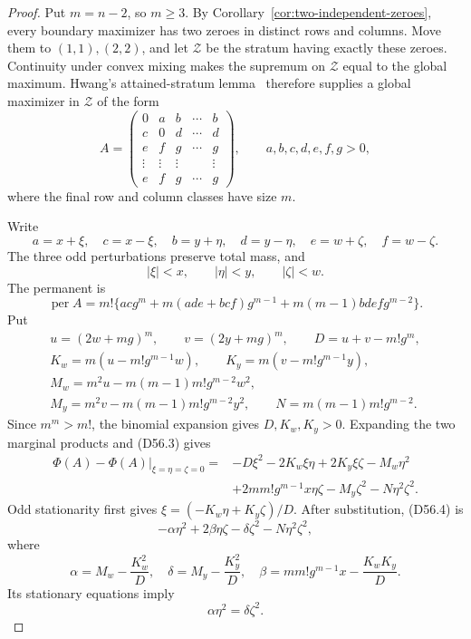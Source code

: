 \documentclass[11pt]{amsart}
\theoremstyle{definition}
\theoremstyle{remark}
\begin{document}
\begin{proof}
Put \(m=n-2\), so \(m\geq3\).  By
Corollary~\ref{cor:two-independent-zeroes}, every boundary maximizer has two
zeroes in distinct rows and columns.  Move them to \((1,1),(2,2)\), and let
\(\mathcal Z\) be the stratum having exactly these zeroes. Continuity under
convex mixing makes the supremum on \(\mathcal Z\) equal to the global
maximum. Hwang's attained-stratum lemma~\cite[Lemma 3.4]{CW} therefore
supplies a global maximizer in \(\mathcal Z\) of the form
\[
A=\begin{pmatrix}
0&a&b&\cdots&b\\
c&0&d&\cdots&d\\
e&f&g&\cdots&g\\
\vdots&\vdots&\vdots&&\vdots\\
e&f&g&\cdots&g
\end{pmatrix},\qquad a,b,c,d,e,f,g>0,              \tag{D56.1}
\]
where the final row and column classes have size \(m\).

Write
\[
a=x+\xi,\quad c=x-\xi,\quad b=y+\eta,\quad d=y-\eta,
\quad e=w+\zeta,\quad f=w-\zeta.
\]
The three odd perturbations preserve total mass, and
\[
|\xi|<x,\qquad|\eta|<y,\qquad|\zeta|<w.             \tag{D56.2}
\]
The permanent is
\[
\operatorname{per}A=m!\{acg^m+m(ade+bcf)g^{m-1}
+m(m-1)bdefg^{m-2}\}.                              \tag{D56.3}
\]
Put
\[
\begin{gathered}
u=(2w+mg)^m,\qquad v=(2y+mg)^m,\qquad D=u+v-m!g^m,\\
K_w=m(u-m!g^{m-1}w),\qquad K_y=m(v-m!g^{m-1}y),\\
M_w=m^2u-m(m-1)m!g^{m-2}w^2,\\
M_y=m^2v-m(m-1)m!g^{m-2}y^2,\qquad
N=m(m-1)m!g^{m-2}.
\end{gathered}
\]
Since \(m^m>m!\), the binomial expansion gives \(D,K_w,K_y>0\).
Expanding the two marginal products and (D56.3) gives
\[
\begin{split}
\Phi(A)-\Phi(A)|_{\xi=\eta=\zeta=0}
={}&-D\xi^2-2K_w\xi\eta+2K_y\xi\zeta-M_w\eta^2\\
&+2mm!g^{m-1}x\eta\zeta-M_y\zeta^2-N\eta^2\zeta^2.
\end{split}
\tag{D56.4}
\]
Odd stationarity first gives
\(\xi=(-K_w\eta+K_y\zeta)/D\). After substitution, (D56.4) is
\[
-\alpha\eta^2+2\beta\eta\zeta-\delta\zeta^2
-N\eta^2\zeta^2,                                  \tag{D56.5}
\]
where
\[
\alpha=M_w-\frac{K_w^2}{D},\quad
\delta=M_y-\frac{K_y^2}{D},\quad
\beta=mm!g^{m-1}x-\frac{K_wK_y}{D}.                \tag{D56.6}
\]
Its stationary equations imply
\[
\alpha\eta^2=\delta\zeta^2.                        \tag{D56.7}
\]


\end{proof}
\end{document}
